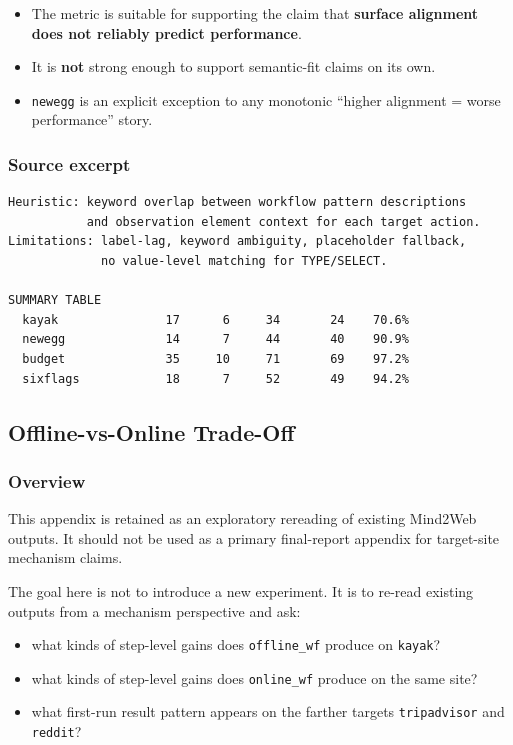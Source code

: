 \begin{itemize}
\tightlist
\item
  The metric is suitable for supporting the claim that \textbf{surface
  alignment does not reliably predict performance}.
\item
  It is \textbf{not} strong enough to support semantic-fit claims on its
  own.
\item
  \texttt{newegg} is an explicit exception to any monotonic ``higher
  alignment = worse performance'' story.
\end{itemize}

\subsubsection{Source excerpt}

\begin{verbatim}
Heuristic: keyword overlap between workflow pattern descriptions
           and observation element context for each target action.
Limitations: label-lag, keyword ambiguity, placeholder fallback,
             no value-level matching for TYPE/SELECT.

SUMMARY TABLE
  kayak               17      6     34       24    70.6%
  newegg              14      7     44       40    90.9%
  budget              35     10     71       69    97.2%
  sixflags            18      7     52       49    94.2%
\end{verbatim}


\clearpage
\subsection{Offline-vs-Online Trade-Off}\label{app:A7}

\subsubsection{Overview}

This appendix is retained as an exploratory rereading of existing
Mind2Web outputs. It should not be used as a primary final-report
appendix for target-site mechanism claims.

The goal here is not to introduce a new experiment. It is to re-read
existing outputs from a mechanism perspective and ask:

\begin{itemize}
\tightlist
\item
  what kinds of step-level gains does \texttt{offline\_wf} produce on
  \texttt{kayak}?
\item
  what kinds of step-level gains does \texttt{online\_wf} produce on the
  same site?
\item
  what first-run result pattern appears on the farther targets
  \texttt{tripadvisor} and \texttt{reddit}?
\end{itemize}

